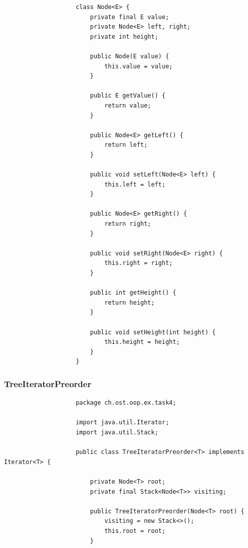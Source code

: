 \documentclass[a4paper, landscape, 8pt]{scrartcl}
\begin{document}
\begin{multicols*}{4}
\begin{lstlisting}
                    class Node<E> {
                        private final E value;
                        private Node<E> left, right;
                        private int height;

                        public Node(E value) {
                            this.value = value;
                        }

                        public E getValue() {
                            return value;
                        }

                        public Node<E> getLeft() {
                            return left;
                        }

                        public void setLeft(Node<E> left) {
                            this.left = left;
                        }

                        public Node<E> getRight() {
                            return right;
                        }

                        public void setRight(Node<E> right) {
                            this.right = right;
                        }

                        public int getHeight() {
                            return height;
                        }

                        public void setHeight(int height) {
                            this.height = height;
                        }
                    }
                    \end{lstlisting}
                
                \subsubsection{TreeIteratorPreorder}
                    \begin{lstlisting}
                    package ch.ost.oop.ex.task4;

                    import java.util.Iterator;
                    import java.util.Stack;

                    public class TreeIteratorPreorder<T> implements Iterator<T> {

                        private Node<T> root;
                        private final Stack<Node<T>> visiting;

                        public TreeIteratorPreorder(Node<T> root) {
                            visiting = new Stack<>();
                            this.root = root;
                        }


\end{lstlisting}
\end{multicols*}
\end{document}

